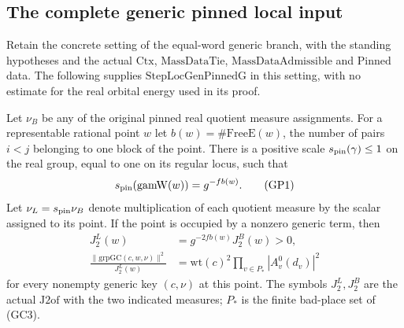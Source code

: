\subsection{The complete generic pinned local input}
\label{sec:flag-generic-pinned-input}

Retain the concrete setting of the equal-word generic branch,
with the standing hypotheses and the actual \(\mathrm{Ctx}\),
\(\mathrm{MassDataTie}\), \(\mathrm{MassDataAdmissible}\) and
\(\mathrm{Pinned}\) data. The following supplies
\(\mathrm{StepLocGenPinnedG}\) in this setting, with no estimate
for the real orbital energy used in its proof.

\begin{lemma}
\label{lem:flag-pin-scale}
Let \(\nu_B\) be any of the original pinned real quotient
measure assignments. For a representable rational point \(w\)
let \(b(w)=\#\mathrm{FreeE}(w)\), the number of pairs \(i<j\)
belonging to one block of the point. There is a positive scale
\(s_{\rm pin}(\gamma)\le1\) on the real group, equal to one on
its regular locus, such that
\[
  s_{\rm pin}(\mathrm{gamW}(w))=g^{-fb(w)} .              \tag{GP1}
\]
Let \(\nu_L=s_{\rm pin}\nu_B\) denote multiplication of each
quotient measure by the scalar assigned to its point.
If the point is occupied by a nonzero generic term, then
\[
 \begin{split}
 J_2^L(w)&=g^{-2fb(w)}J_2^B(w)>0,\\
 \frac{\|\mathrm{grpGC}(c,w,\nu)\|^2}{J_2^L(w)}
       &=\mathrm{wt}(c)^2
             \prod_{v\in P_*}|A_v^0(d_v)|^2
 \end{split}
 \tag{GP2}
\]
for every nonempty generic key \((c,\nu)\) at this point.
The symbols \(J_2^L,J_2^B\) are the actual \(\mathrm{J2of}\)
with the two indicated measures; \(P_*\) is the finite
bad-place set of (GC3).
\end{lemma}
